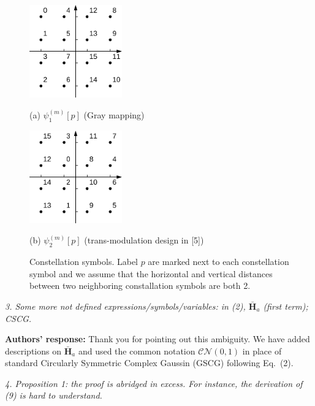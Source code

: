 \documentclass[onecolumn, 11pt, draftclsnofoot]{IEEEtran}
\begin{document}
\begin{figure}[htb]
  \begin{minipage}[b]{0.48\linewidth}
    \centering
    \centerline{\includegraphics[width=4.0cm]{./figs/gray.eps}}
    \centerline{(a) $\psi_1^{(m)}[p]$ (Gray mapping)}\medskip
  \end{minipage}
  \hfill
  \begin{minipage}[b]{.48\linewidth}
    \centering
    \centerline{\includegraphics[width=4.0cm]{./figs/karim.eps}}
    \centerline{(b) $\psi_2^{(m)}[p]$ (trans-modulation design in [5])}\medskip
  \end{minipage}
  \caption{Constellation symbols. Label $p$ are marked next to each
  constellation symbol and we assume that the horizontal and vertical
  distances between two neighboring constallation symbols are both 2.}
  \label{fig:mapping}
\end{figure}
\vspace{0.5cm}

\noindent
\emph{3. Some more not defined expressions/symbols/variables: in (2),
$\bar{\mathbf{H}}_a$ (first term); CSCG.}

\noindent \textbf{Authors' response:}
Thank you for pointing out this ambiguity. We have added descriptions on
$\bar{\mathbf{H}}_a$ and used the common notation $\mathcal{CN}(0,1)$
in place of standard Circularly Symmetric Complex Gaussin (GSCG) following
Eq.~(2).

\vspace{0.5cm}

\noindent
\emph{4. Proposition 1: the proof is abridged in excess. For instance, the
derivation of (9) is hard to understand.}
\end{document}
